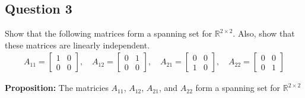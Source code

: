 \documentclass{article}
\begin{document}
\subsection*{Question 3}
Show that the following matrices form a spanning set for \(\mathbb{R}^{2 \times 2}\). Also, show that these matrices are linearly independent.
\begin{align*}
A_{11} = \begin{bmatrix} 1 & 0 \\ 0 & 0 \end{bmatrix}, \quad
A_{12} = \begin{bmatrix} 0 & 1 \\ 0 & 0 \end{bmatrix}, \quad
A_{21} = \begin{bmatrix} 0 & 0 \\ 1 & 0 \end{bmatrix}, \quad
A_{22} = \begin{bmatrix} 0 & 0 \\ 0 & 1 \end{bmatrix}
\end{align*}

\noindent
\textbf{Proposition:} The matricies $A_{11}$, $A_{12}$, $A_{21}$, and $A_{22}$ form a spanning set for $\mathbb{R}^{2 \times 2}$
\end{document}
